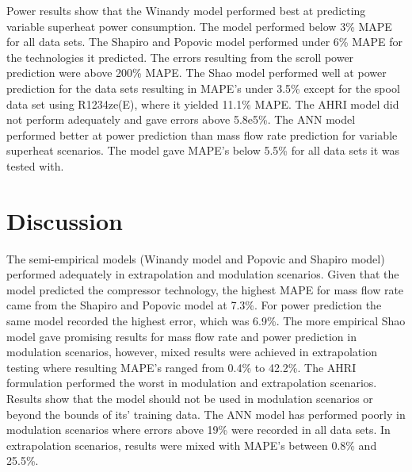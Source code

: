 \documentclass[preprint,11pt,authoryear]{elsarticle}
\begin{document}
\begin{table}[h]
\caption{Power results for variable superheat scenarios.}
\label{Tab:data_info}
\begin{center}
\end{center}
\end{table}

Power results show that the Winandy model performed best at predicting variable superheat power consumption. The model performed below 3\% MAPE for all data sets. The Shapiro and Popovic model performed under 6\% MAPE for the technologies it predicted. The errors resulting from the scroll power prediction were above 200\% MAPE. The Shao model performed well at power prediction for the data sets resulting in MAPE's under 3.5\% except for the spool data set using R1234ze(E), where it yielded 11.1\% MAPE. The AHRI model did not perform adequately and gave errors above 5.8e5\%. The ANN model performed better at power prediction than mass flow rate prediction for variable superheat scenarios. The model gave MAPE's below 5.5\% for all data sets it was tested with. 


\section{Discussion}
The semi-empirical models (Winandy model and Popovic and Shapiro model) performed adequately in extrapolation and modulation scenarios. Given that the model predicted the compressor technology, the highest MAPE for mass flow rate came from the Shapiro and Popovic model at 7.3\%. For power prediction the same model recorded the highest error, which was 6.9\%. The more empirical Shao model gave promising results for mass flow rate and power prediction in modulation scenarios, however, mixed results were achieved in extrapolation testing where resulting MAPE's ranged from 0.4\% to 42.2\%. The AHRI formulation performed the worst in modulation and extrapolation scenarios. Results show that the model should not be used in modulation scenarios or beyond the bounds of its' training data. The ANN model has performed poorly in modulation scenarios where errors above 19\% were recorded in all data sets. In extrapolation scenarios, results were mixed with MAPE's between 0.8\% and 25.5\%. 
\end{document}
